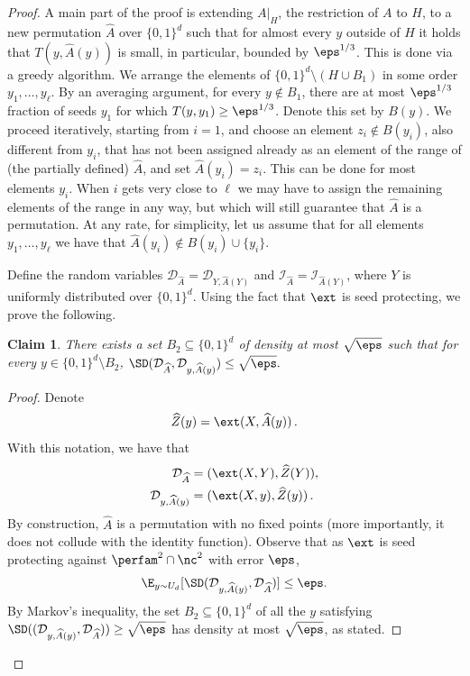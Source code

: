 \documentclass[11pt]{article}
\numberwithin{equation}{section}
\newtheorem{claim}[theorem]{Claim}
\theoremstyle{definition}
\theoremstyle{plain}
\begin{document}
\begin{proof}
                A main part of the proof is extending $A|_H$, the restriction of $A$ to $H$, to a new permutation $\widehat{A}$ over $\{0,1\}^d$ such that for almost every $y$ outside of $H$ it holds that $T(y,\widehat{A}(y))$ is small, in particular, bounded by $\eps^{1/3}$. This is done via a greedy algorithm. We arrange the elements of $\{0,1\}^d \setminus (H \cup B_1)$ in some order $y_1,\ldots,y_\ell$. By an averaging argument, for every $y \not\in B_1$, there are at most $\eps^{1/3}$ fraction of seeds $y_1$ for which $T(y,y_1) \ge \eps^{1/3}$. Denote this set by $B(y)$. We proceed iteratively, starting from $i = 1$, and choose an element $z_i \not\in B(y_i)$, also different from $y_i$, that has not been assigned already as %
an element of the range %
of (the partially defined) $\widehat{A}$, 
and set $\widehat{A}(y_i) = z_i$. This can be done for most
%
elements $y_i$.  %
%
%
When $i$ gets very close to $\ell$ we may have to assign the remaining 
%
elements of the range %
in any way, but which will still
%
 guarantee that $\widehat{A}$ is a permutation. At any rate, for simplicity, let us assume that for all elements $y_1,\ldots,y_\ell$ we have that $\widehat{A}(y_i) \not\in B(y_i) \cup \{y_i\}$.
		

Define the random variables $\mathcal{D}_{\widehat{A}} = \mathcal{D}_{Y,\widehat{A}(Y)}$ and 
$\mathcal{I}_{\widehat{A}} = \mathcal{I}_{\widehat{A}(Y)}$,
	where $Y$ is uniformly distributed over $\{0,1\}^d$. Using the fact that $\ext$ is seed protecting, we prove the following.
	
	\begin{claim}\label{claim:d is concentrated i}
		There exists a set $B_2 \subseteq \{0,1\}^d$ of density at most $\sqrt{\eps}$ such that for every $y \in \{0,1\}^d \setminus B_2$,
		$
		\SD(\mathcal{D}_{\widehat{A}}, \mathcal{D}_{y,\widehat{A}(y)}) \le \sqrt{\eps}.
		$
	\end{claim}
	
	\begin{proof}
		Denote 
\[
		\widehat{Z}(y) =\ext(X,\widehat{A}(y))\,.
\]
		With this notation, we have that
		\begin{align*}
		\mathcal{D}_{\widehat{A}} &= ( \ext(X,Y), \widehat{Z}(Y) ),\\
		\mathcal{D}_{y,\widehat{A}(y)} &= ( \ext(X,y), \widehat{Z}(y) )\,.
		\end{align*}
			By construction, $\widehat{A}$ is a permutation with no fixed points (more importantly, it does not collude with the identity function). Observe that as $\ext$ is seed protecting against $\perfam^2 \cap \nc^2$ with error $\eps$, 
		\[
		\E_{y\sim U_d}[\SD(\mathcal{D}_{y,\widehat{A}(y)}, \mathcal{D}_{\widehat{A}})] \leq \eps.
		\]
By Markov's inequality, the set $B_2 \subseteq \{0,1\}^d$ of %
all the $y$  %
satisfying
$
		\SD((\mathcal{D}_{y,\widehat{A}(y)}, \mathcal{D}_{\widehat{A}})) \geq \sqrt{\eps}
		$
		has density at most $\sqrt{\eps}$, as stated.
		

\end{proof}
\end{proof}
\end{document}
